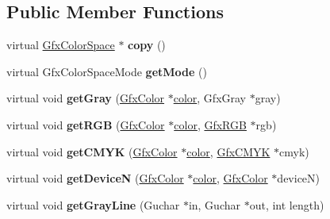 \subsection*{Public Member Functions}
\begin{DoxyCompactItemize}
\item 
\mbox{\label{class_gfx_device_gray_color_space_adee0d9ef073f1c391a0ca2b19fa33e7f}} 
virtual \hyperlink{class_gfx_color_space}{Gfx\+Color\+Space} $\ast$ {\bfseries copy} ()
\item 
\mbox{\label{class_gfx_device_gray_color_space_a8ae50db650775633e9a906f2ac2b080b}} 
virtual Gfx\+Color\+Space\+Mode {\bfseries get\+Mode} ()
\item 
\mbox{\label{class_gfx_device_gray_color_space_af598e5135251003e03d975f4d7295784}} 
virtual void {\bfseries get\+Gray} (\hyperlink{struct_gfx_color}{Gfx\+Color} $\ast$\hyperlink{structcolor}{color}, Gfx\+Gray $\ast$gray)
\item 
\mbox{\label{class_gfx_device_gray_color_space_a5039e9e8ea3ba8c3bee36be269750451}} 
virtual void {\bfseries get\+R\+GB} (\hyperlink{struct_gfx_color}{Gfx\+Color} $\ast$\hyperlink{structcolor}{color}, \hyperlink{struct_gfx_r_g_b}{Gfx\+R\+GB} $\ast$rgb)
\item 
\mbox{\label{class_gfx_device_gray_color_space_ae6e3f5a1919f7f54badf9e7b1f6b523f}} 
virtual void {\bfseries get\+C\+M\+YK} (\hyperlink{struct_gfx_color}{Gfx\+Color} $\ast$\hyperlink{structcolor}{color}, \hyperlink{struct_gfx_c_m_y_k}{Gfx\+C\+M\+YK} $\ast$cmyk)
\item 
\mbox{\label{class_gfx_device_gray_color_space_a73d8b44f978ca49ff84a10a389fee501}} 
virtual void {\bfseries get\+DeviceN} (\hyperlink{struct_gfx_color}{Gfx\+Color} $\ast$\hyperlink{structcolor}{color}, \hyperlink{struct_gfx_color}{Gfx\+Color} $\ast$deviceN)
\item 
\mbox{\label{class_gfx_device_gray_color_space_a8a047bd676b4cd6032b61d778c93d979}} 
virtual void {\bfseries get\+Gray\+Line} (Guchar $\ast$in, Guchar $\ast$out, int length)

\end{DoxyCompactItemize}
